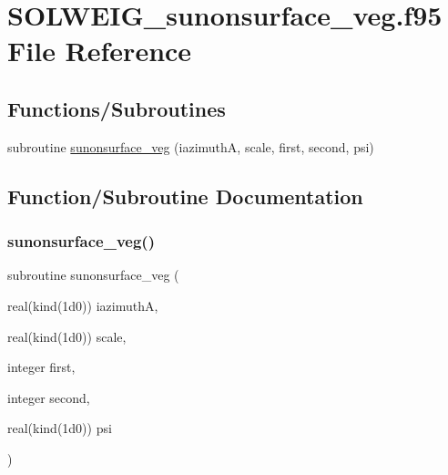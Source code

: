 \hypertarget{_s_o_l_w_e_i_g__sunonsurface__veg_8f95}{}\section{S\+O\+L\+W\+E\+I\+G\+\_\+sunonsurface\+\_\+veg.\+f95 File Reference}
\label{_s_o_l_w_e_i_g__sunonsurface__veg_8f95}
\subsection*{Functions/\+Subroutines}
\begin{DoxyCompactItemize}
\item 
subroutine \hyperlink{_s_o_l_w_e_i_g__sunonsurface__veg_8f95_ace4703fb49ca4327e73e8070420cd8ad}{sunonsurface\+\_\+veg} (iazimuthA, scale, first, second, psi)
\end{DoxyCompactItemize}


\subsection{Function/\+Subroutine Documentation}
\mbox{\label{_s_o_l_w_e_i_g__sunonsurface__veg_8f95_ace4703fb49ca4327e73e8070420cd8ad}} 
\subsubsection{\texorpdfstring{sunonsurface\+\_\+veg()}{sunonsurface\_veg()}}
{\footnotesize\ttfamily subroutine sunonsurface\+\_\+veg (\begin{DoxyParamCaption}\item[{real(kind(1d0))}]{iazimuthA,  }\item[{real(kind(1d0))}]{scale,  }\item[{integer}]{first,  }\item[{integer}]{second,  }\item[{real(kind(1d0))}]{psi }\end{DoxyParamCaption})}



